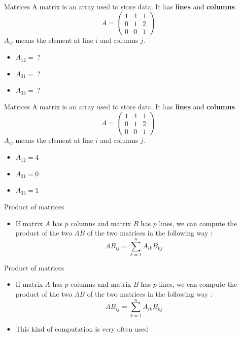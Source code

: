 \documentclass{beamer}
\begin{document}
\begin{frame}{Matrices}
    A matrix is an array used to store data. It has \textbf{{lines}}  and
    \textbf{{columns}} 
$$
A=
\begin{pmatrix}
1 & 4 & 1 \\
0 & 1 & 2 \\
0 & 0 & 1
\end{pmatrix}
$$
    $A_{ij}$ means the element at line $i$ and columns $j$.
    \begin{itemize}
        \item $A_{12}=\;$?
        \item $A_{31}=\;$?
        \item $A_{33}=\;$?
    \end{itemize}
\end{frame}

\begin{frame}{Matrices}
    A matrix is an array used to store data. It has \textbf{{lines}}  and
    \textbf{{columns}} 
$$
A=
\begin{pmatrix}
1 & 4 & 1 \\
0 & 1 & 2 \\
0 & 0 & 1
\end{pmatrix}
$$
    $A_{ij}$ means the element at line $i$ and columns $j$.
    \begin{itemize}
        \item $A_{12}=4$
        \item $A_{31}=0$
        \item $A_{33}=1$
    \end{itemize}
\end{frame}

\begin{frame}{Product of matrices}
    \begin{itemize}
        \item If matrix $A$ has $p$ columns and matrix $B$ has $p$ lines, we
            can compute the product of the two $AB$ of the two matrices in the
            following way : 
            \begin{equation}
                AB_{ij}= \sum^{n}_{k=1} A_{ik}B_{kj}
            \end{equation}
    \end{itemize}
\end{frame}

\begin{frame}{Product of matrices}
    \begin{itemize}
        \item If matrix $A$ has $p$ columns and matrix $B$ has $p$ lines, we
            can compute the product of the two $AB$ of the two matrices in the
            following way : 
            \begin{equation}
                AB_{ij}= \sum^{n}_{k=1} A_{ik}B_{kj}
            \end{equation}
        \item This kind of computation is very often used
    \end{itemize}
\end{frame}
\end{document}

